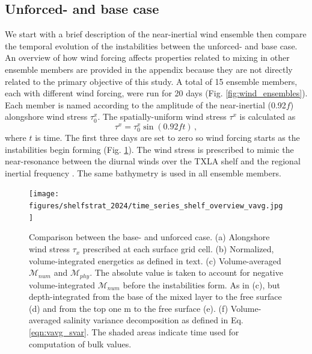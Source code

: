 \subsection{Unforced- and base case}
We start with a brief description of the near-inertial wind ensemble then compare the temporal evolution of the instabilities between the unforced- and base case. An overview of how wind forcing affects properties related to mixing in other ensemble members are provided in the appendix because they are not directly related to the primary objective of this study. A total of 15 ensemble members, each with different wind forcing, were run for 20 days (Fig. \ref{fig:wind_ensembles}). Each member is named according to the amplitude of the near-inertial (0.92$f$) alongshore wind stress $\tau_0^x$. The spatially-uniform wind stress $\tau^x$ is calculated as
\begin{equation}
    \tau^x = \tau_0^x \sin(0.92 f t) \, , 
\end{equation}
where $t$ is time. The first three days are set to zero so wind forcing starts as the instabilities begin forming (Fig. \ref{fig:time_series_base}). The wind stress is prescribed to mimic the near-resonance between the diurnal winds over the TXLA shelf and the regional inertial frequency \citep{Qu_2022_NIW}. The same bathymetry is used in all ensemble members.

\begin{figure}[t!]
    \begin{center}
    \texttt{[image: figures/shelfstrat\_2024/time\_series\_shelf\_overview\_vavg.jpg]}\\
    \caption{Comparison between the base- and unforced case. (a) Alongshore wind stress $\tau_x$ prescribed at each surface grid cell. (b) Normalized, volume-integrated energetics as defined in text. (c) Volume-averaged $\mathcal{M}_{num}$ and $\mathcal{M}_{phy}$. The absolute value is taken to account for negative volume-integrated $\mathcal{M}_{num}$ before the instabilities form. As in (c), but depth-integrated from the base of the mixed layer to the free surface (d) and from the top one m to the free surface (e). (f) Volume-averaged salinity variance decomposition as defined in Eq. \ref{eqn:vavg_svar}. The shaded areas indicate time used for computation of bulk values.}\label{fig:time_series_base}
     \end{center}
\end{figure} 

